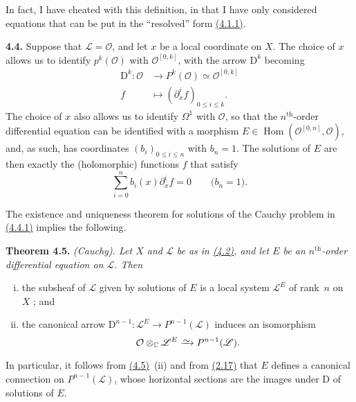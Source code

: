 \documentclass{report}
\newenvironment{itenv}[1]
  {\phantomsection\par\medskip\noindent\textbf{#1.}\itshape}
  {\medskip}
\newenvironment{rmenv}[1]
  {\phantomsection\par\medskip\noindent\textbf{#1.}\rmfamily}
  {\medskip}
\newcommand{\scr}[1]{{\mathscr{#1}}}
\renewcommand{\cal}[1]{{\mathcal{#1}}}
\newcommand{\CC}{\mathbb{C}}
\newcommand{\DD}{\mathrm{D}}
\newcommand{\simto}{\xrightarrow{\raisebox{-0.7ex}[0ex][0ex]{$\sim$}}}
\renewcommand{\leq}{\leqslant}
\DeclareMathOperator{\Hom}{Hom}
\newcommand{\oldpage}[1]{\marginpar{\footnotesize$\Big\vert$ \textit{p.~#1}}}
\begin{document}
In fact, I have cheated with this definition, in that I have only considered equations that can be put in the ``resolved'' form \hyperref[I.4.1.1]{(4.1.1)}.

\oldpage{25}
\begin{rmenv}{4.4}
\label{I.4.4}
  Suppose that $\scr{L}=\cal{O}$, and let $x$ be a local coordinate on $X$.
  The choice of $x$ allows us to identify $p^k(\cal{O})$ with $\cal{O}^{[0,k]}$, with the arrow $\DD^k$ becoming
  \[
    \begin{aligned}
      \DD^k\colon \cal{O} &\to P^k(\cal{O}) \simeq \cal{O}^{[0,k]}
    \\f &\mapsto (\partial_x^i f)_{0\leq i\leq k}.
    \end{aligned}
  \]
  The choice of $x$ also allows us to identify $\Omega^1$ with $\cal{O}$, so that the $n^\mathrm{th}$-order differential equation can be identified with a morphism $E\in\Hom(\cal{O}^{[0,n]},\cal{O})$, and, as such, has coordinates $(b_i)_{0\leq i\leq n}$ with $b_n=1$.
  The solutions of $E$ are then exactly the (holomorphic) functions $f$ that satisfy
  \[
  \label{I.4.4.1}
    \sum_{i=0}^n b_i(x) \partial_x^i f = 0
    \qquad\mbox{($b_n=1$).}
  \tag{4.4.1}
  \]

  The existence and uniqueness theorem for solutions of the Cauchy problem in \hyperref[I.4.4.1]{(4.4.1)} implies the following.
\end{rmenv}

\begin{itenv}{Theorem 4.5}
\label{I.4.5}
  \emph{(Cauchy).}
  Let $X$ and $\scr{L}$ be as in \hyperref[I.4.2]{(4.2)}, and let $E$ be an $n^\mathrm{th}$-order differential equation on $\scr{L}$.
  Then
  \begin{enumerate}[(i)]
    \item the subsheaf of $\scr{L}$ given by solutions of $E$ is a local system $\scr{L}^E$ of rank~$n$ on $X$ ; and
    \item the canonical arrow $\DD^{n-1}\colon\scr{L}^E \to P^{n-1}(\scr{L})$ induces an isomorphism
      \[
        \cal{O}\otimes_\CC\scr{L}^E \simto P^{n-1}(\scr{L}).
      \]
  \end{enumerate}
\end{itenv}

In particular, it follows from \hyperref[I.4.5]{(4.5)}~(ii) and from \hyperref[I.2.17]{(2.17)} that $E$ defines a canonical connection on $P^{n-1}(\scr{L})$, whose horizontal sections are the images under $\DD$ of solutions of $E$.
\end{document}
